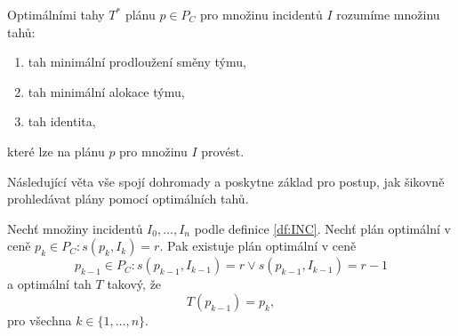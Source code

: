 \begin{definice}\label{df:optimalniTahy}
  Optimálními tahy $T^*$ plánu $p \in P_C$ pro množinu incidentů $I$ rozumíme množinu tahů:
  \begin{enumerate}
  \item
    tah minimální prodloužení směny týmu,
  \item
    tah minimální alokace týmu,
  \item
    tah identita,
  \end{enumerate}
  které lze na plánu $p$ pro množinu $I$ provést.
\end{definice}

Následující věta vše spojí dohromady a poskytne základ pro postup, jak šikovně prohledávat plány pomocí optimálních tahů.
\begin{veta}\label{veta:optimalniTahy}
  Nechť množiny incidentů $I_0, \dots, I_n$ podle definice \ref{df:INC}.
  Nechť plán optimální v ceně $p_k \in P_C \colon s(p_k, I_k) = r$.
  Pak existuje plán optimální v ceně
  \begin{equation*}
    p_{k-1} \in P_C \colon s(p_{k-1}, I_{k-1}) = r \lor s(p_{k-1}, I_{k-1}) = r - 1
  \end{equation*}
  a optimální tah $T$ takový, že
  \begin{equation*}
    T(p_{k-1}) = p_k,
  \end{equation*}
  pro všechna $k \in \{ 1, \dots, n\}$.
\end{veta}
